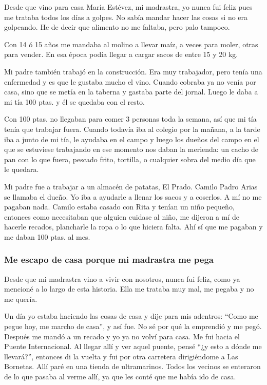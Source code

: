 \documentclass[12pt,a5paper]{book}
\begin{document}
Desde que vino para casa María Estévez, mi madrastra, yo nunca fui feliz pues me trataba todos los días a golpes. No sabía mandar hacer las cosas si no era golpeando. He de decir que alimento no me faltaba, pero palo tampoco.

Con 14 ó 15 años me mandaba al molino a llevar maíz, a veces para moler, otras para vender. En esa época podía llegar a cargar sacos de entre 15 y 20 kg.

Mi padre también trabajó en la construcción. Era muy trabajador, pero tenía una enfermedad y es que le gustaba mucho el vino. Cuando cobraba ya no venía por casa, sino que se metía en la taberna y gastaba parte del jornal. Luego le daba a mi tía 100 ptas. y él se quedaba con el resto.

Con 100 ptas. no llegaban para comer 3 personas toda la semana, así que mi tía tenía que trabajar fuera. Cuando todavía iba al colegio por la mañana, a la tarde iba a junto de mi tía, le ayudaba en el campo y luego los dueños del campo en el que se estuviese trabajando en ese momento nos daban la merienda: un cacho de pan con lo que fuera, pescado frito, tortilla, o cualquier sobra del medio día que le quedara.

Mi padre fue a trabajar a un almacén de patatas, El Prado. Camilo Padro Arias se llamaba el dueño. Yo iba a ayudarle a llenar los sacos y a coserlos. A mí no me pagaban nada. Camilo estaba casado con Rita y tenían un niño pequeño, entonces como necesitaban que alguien cuidase al niño, me dijeron a mí de hacerle recados, plancharle la ropa o lo que hiciera falta. Ahí sí que me pagaban y me daban 100 ptas. al mes.


\subsubsection*{Me escapo de casa porque mi madrastra me pega}

Desde que mi madrastra vino a vivir con nosotros, nunca fui feliz, como ya mencioné a lo largo de esta historia. Ella me trataba muy mal, me pegaba y no me quería.

Un día yo estaba haciendo las cosas de casa y dije para mis adentros: ``Como me pegue hoy, me marcho de casa'', y así fue. No sé por qué la emprendió y me pegó. Después me mandó a un recado y yo ya no volví para casa. Me fui hacia el Puente Internacional. Al llegar allí y ver aquel puente, pensé ``¿y esto a dónde me llevará?'', entonces di la vuelta y fui por otra carretera dirigiéndome a Las Bornetas. Allí paré en una tienda de ultramarinos. Todos los vecinos se enteraron de lo que pasaba al verme allí, ya que les conté que me había ido de casa.
\end{document}

